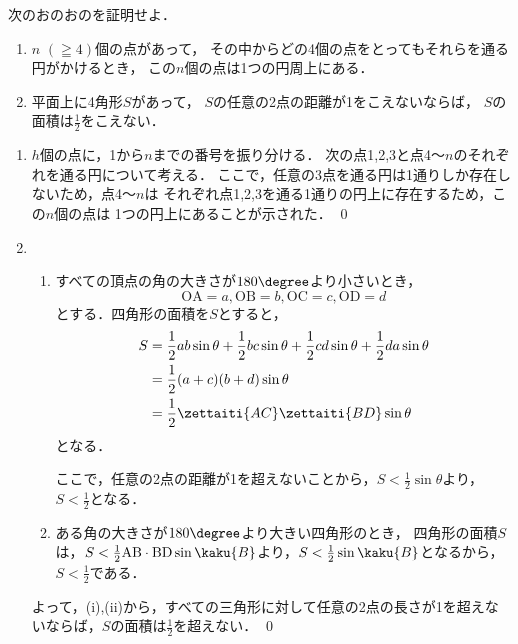 
\begin{problem}
  次のおのおのを証明せよ．
\begin{enumerate}
\item $n$ $(\geqq4)$個の点があって，
その中からどの4個の点をとってもそれらを通る円がかけるとき，
この$n$個の点は1つの円周上にある．
\item 平面上に4角形$S$があって，
$S$の任意の2点の距離が1をこえないならば，
$S$の面積は$\displaystyle\frac{1}{2}$をこえない．
\end{enumerate}
\end{problem}

\begin{enumerate}
  \item $h$個の点に，1から$n$までの番号を振り分ける．
  次の点1,2,3と点4～$n$のそれぞれを通る円について考える．
  ここで，任意の3点を通る円は1通りしか存在しないため，点4～$n$は
  それぞれ点1,2,3を通る1通りの円上に存在するため，この$n$個の点は
  1つの円上にあることが示された．
  \qed

  \item \begin{enumerate}
    \item すべての頂点の角の大きさが$180\degree$より小さいとき，
    \[\mathrm{OA} = a, \mathrm{OB} = b, \mathrm{OC} = c,
    \mathrm{OD} = d\]
    とする．四角形の面積を$S$とすると，
    \begin{align*}
      S &= \frac12 ab\sin\theta + \frac12 bc\sin\theta + \frac12 cd\sin\theta + \frac 12da\sin\theta \\
      &= \frac12(a+c)(b+d)\sin\theta \\
      &= \frac12 \zettaiti{AC}\zettaiti{BD} \sin\theta
    \end{align*}
    となる．

    ここで，任意の2点の距離が1を超えないことから，$S < \frac12\sin\theta$より，
    $S<\frac12$となる．

    \item ある角の大きさが$180\degree$より大きい四角形のとき，
    四角形の面積$S$は，$S< \frac12 \mathrm{AB}\cdot\mathrm{BD}\sin\kaku{B}$より，$S < \frac12 \sin\kaku{B}$となるから，$S < \frac12$である．
  \end{enumerate}

  よって，(i),(ii)から，すべての三角形に対して任意の2点の長さが1を超えないならば，$S$の面積は$\frac12$を超えない． \qed
\end{enumerate}
